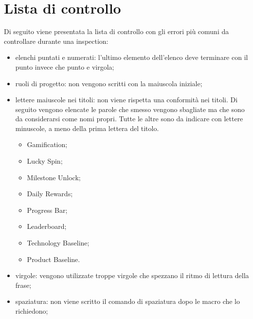 \section {Lista di controllo}
Di seguito viene presentata la lista di controllo con gli errori più comuni da controllare
durante una inspection:

\begin{itemize}
		\item elenchi puntati e numerati: l'ultimo elemento dell'elenco deve terminare con il punto invece che punto e virgola;
		\item ruoli di progetto: non vengono scritti con la maiuscola iniziale;
		\item lettere maiuscole nei titoli: non viene rispetta una conformità nei titoli. Di seguito vengono elencate le parole che smesso vengono sbagliate ma che sono da considerarsi come nomi propri. Tutte le altre sono da indicare con lettere minuscole, a meno della prima lettera del titolo.
		\begin{itemize}
			\item Gamification;
			\item Lucky Spin;
			\item Milestone Unlock;
			\item Daily Rewards;
			\item Progress Bar;
			\item Leaderboard;
			\item Technology Baseline;
			\item Product Baseline.
		\end{itemize}
		\item virgole: vengono utilizzate troppe virgole che spezzano il ritmo di lettura della
frase;
		\item spaziatura: non viene scritto il comando di spaziatura dopo le macro che lo
richiedono;
	
\end{itemize}